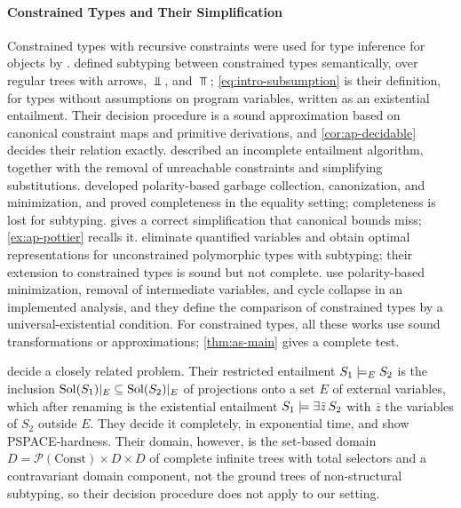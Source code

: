 \paragraph{Constrained Types and Their Simplification}
Constrained types with recursive constraints were used for type inference for
objects by \citet{EifrigSmithTrifonov95}. \citet{TrifonovSmith96} defined
subtyping between constrained types semantically, over regular trees with
arrows, $\Bot$, and $\Top$; \cref{eq:intro-subsumption} is their
definition, for types without assumptions on program variables, written as an
existential entailment. Their decision procedure is a sound approximation
based on canonical constraint maps and primitive derivations, and
\cref{cor:ap-decidable} decides their relation exactly. \citet{Pottier96}
described an incomplete entailment algorithm, together with the removal of
unreachable constraints and simplifying substitutions. \citet{Pottier01}
developed polarity-based garbage collection, canonization, and minimization,
and proved completeness in the equality setting; completeness is lost for
subtyping. \citet[Section~8.5]{Pottier98thesis} gives a correct simplification
that canonical bounds miss; \cref{ex:ap-pottier} recalls it.
\citet{AikenWimmersPalsberg99} eliminate quantified variables and obtain
optimal representations for unconstrained polymorphic types with subtyping;
their extension to constrained types is sound but not complete.
\citet{FahndrichAiken96} use polarity-based minimization, removal of
intermediate variables, and cycle collapse in an implemented analysis, and they
define the comparison of constrained types by a universal-existential
condition. For constrained types, all these works use sound transformations or
approximations; \cref{thm:as-main} gives a complete test.

\citet{FlanaganFelleisen99} decide a closely related problem. Their restricted
entailment $S_1\models_E S_2$ is the inclusion $\operatorname{Sol}(S_1)|_E\subseteq\operatorname{Sol}(S_2)|_E$
of projections onto a set $E$ of external variables, which after renaming is
the existential entailment $S_1\models\exists\bar z\,S_2$ with $\bar z$ the
variables of $S_2$ outside $E$. They decide it completely, in exponential time,
and show PSPACE-hardness. Their domain, however, is the set-based domain
$D=\mathcal P(\mathrm{Const})\times D\times D$ of complete infinite trees with
total selectors and a contravariant domain component, not the ground trees of
non-structural subtyping, so their decision procedure does not apply to our
setting.


